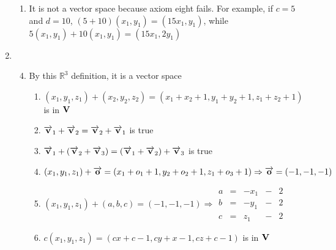\documentclass[12pt]{article}
\begin{document}
\begin{enumerate}
    \begin{enumerate}

      \item It is not a vector space because axiom eight fails. For example, if $c=5$ and $d=10$, $(5+10)(x_1,y_1)=(15x_1,y_1)$, while $5(x_1,y_1)+10(x_1,y_1)=(15x_1,2y_1)$

    \end{enumerate}

  \item

    \begin{enumerate}

        \setcounter{enumii}{3}

      \item By this $\mathbb{R}^3$ definition, it is a vector space

        \begin{enumerate}

          \item $(x_1,y_1,z_1)+(x_2,y_2,z_2)=(x_1+x_2+1,y_1+y_2+1,z_1+z_2+1)$ is in $\bold{V}$ \textcolor{green}{\checkmark}

            \item $\overrightarrow{\bold{v}}_1+\overrightarrow{\bold{v}}_2=\overrightarrow{\bold{v}}_2+\overrightarrow{\bold{v}}_1$ is true \textcolor{green}{\checkmark} 

          \item $\overrightarrow{\bold{v}}_1+\left( \overrightarrow{\bold{v}}_2+\overrightarrow{\bold{v}}_3 \right)=(\overrightarrow{\bold{v}}_1+\overrightarrow{\bold{v}}_2)+\overrightarrow{\bold{v}}_3$ is true \textcolor{green}{\checkmark}

          \item $\left( x_1,y_1,z_1 \right) + \overrightarrow{\bold{o}}= \left( x_1+o_1+1,y_2+o_2+1,z_1+o_3+1 \right)\Rightarrow\overrightarrow{\bold{o}}=(-1,-1,-1)$ \textcolor{green}{\checkmark}

          \item $\left( x_1,y_1,z_1 \right)+\left( a,b,c \right)=(-1,-1,-1)\Rightarrow \begin{array}{ccccc} a&=&-x_1&-&2\\b&=&-y_1&-&2\\c&=&z_1&-&2  \end{array}$ \textcolor{green}{\checkmark}

          \item $c\left( x_1,y_1,z_1 \right)=\left( cx+c-1,cy+x-1,cz+c-1 \right)$ is in $\bold{V}$ \textcolor{green}{\checkmark} 


\end{enumerate}
\end{enumerate}
\end{enumerate}
\end{document}
